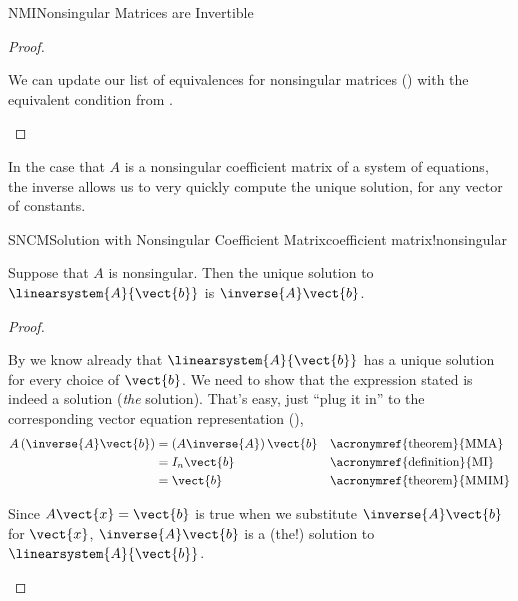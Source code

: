 \begin{subsect}{NMI}{Nonsingular Matrices are Invertible}
\begin{proof}
\begin{para}We can update our list of equivalences for nonsingular matrices () with the equivalent condition from .\end{para}
\end{proof}
%
\begin{para}In the case that $A$ is a nonsingular coefficient matrix of a system of equations, the inverse allows us to very quickly compute the unique solution, for any vector of constants.\end{para}
%
\begin{theorem}{SNCM}{Solution with Nonsingular Coefficient Matrix}{coefficient matrix!nonsingular}
\begin{para}Suppose that $A$ is nonsingular.  Then the unique solution to $\linearsystem{A}{\vect{b}}$ is $\inverse{A}\vect{b}$.\end{para}
\end{theorem}
%
\begin{proof}
\begin{para}By  we know already that $\linearsystem{A}{\vect{b}}$ has a unique solution for every choice of $\vect{b}$.  We need to show that the expression stated is indeed a solution ({\em the} solution).  That's easy, just ``plug it in'' to the corresponding vector equation representation (),
%
\begin{align*}
A\left(\inverse{A}\vect{b}\right)
&=\left(A\inverse{A}\right)\vect{b}&&\text{\acronymref{theorem}{MMA}}\\
&=I_n\vect{b}&&\text{\acronymref{definition}{MI}}\\
&=\vect{b}&&\text{\acronymref{theorem}{MMIM}}
\end{align*}
\end{para}
%
\begin{para}Since $A\vect{x}=\vect{b}$ is true when we substitute $\inverse{A}\vect{b}$ for $\vect{x}$, $\inverse{A}\vect{b}$ is a (the!) solution to $\linearsystem{A}{\vect{b}}$.\end{para}
%
\end{proof}
%
%
%
\end{subsect}
%
